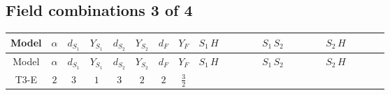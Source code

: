 \documentclass[8pt]{article}
\begin{document}
\begin{landscape}
\subsection*{Field combinations 3 of 4}
\begin{longtable}{@{}cccccccc >{\raggedright\arraybackslash}p{0.21\linewidth} >{\raggedright\arraybackslash}p{0.21\linewidth} >{\raggedright\arraybackslash}p{0.21\linewidth}@{}}
\toprule
Model & $\alpha$ & $d_{S_1}$ & $Y_{S_1}$ & $d_{S_2}$ & $Y_{S_2}$ & $d_F$ & $Y_F$ & $S_1\,H$ & $S_1\,S_2$ & $S_2\,H$ \\
\midrule
\endfirsthead
\toprule
Model & $\alpha$ & $d_{S_1}$ & $Y_{S_1}$ & $d_{S_2}$ & $Y_{S_2}$ & $d_F$ & $Y_F$ & $S_1\,H$ & $S_1\,S_2$ & $S_2\,H$ \\
\midrule
\endhead
T3-E & $2$ & $3$ & $1$ & $3$ & $2$ & $2$ & $\frac{3}{2}$ & \scriptsize\adjustbox{max width=\linewidth}{$\begin{gathered} +\frac{1}{2} H_{a_2} S_{1,j_2} H_{a_1}{}^{\dagger } S_{1,j_1}{}^{\dagger } \mathcal{I}_{H1,a_1,a_2,j_1,j_2}{}^1 \lambda_{HS_1}^{(1)}^{(1)} \\ +\frac{1}{2} H_{a_2} S_{1,j_2} H_{a_1}{}^{\dagger } S_{1,j_1}{}^{\dagger } \mathcal{I}_{H1,a_1,a_2,j_2,j_1}{}^1 \lambda_{HS_1}^{(1)}^{(1)} \\ +\frac{1}{2} H_{a_2} S_{1,j_2} H_{a_1}{}^{\dagger } S_{1,j_1}{}^{\dagger } \mathcal{I}_{H1,a_1,a_2,j_1,j_2}{}^2 \lambda_{HS_1}^{(1)}^{(2)}\end{gathered}$} & \scriptsize\adjustbox{max width=\linewidth}{$\begin{gathered} +S_{1,j_3} S_{2,j_4} S_{1,j_1}{}^{\dagger } S_{2,j_2}{}^{\dagger } \mathcal{I}_{12,j_1,j_3,j_2,j_4}{}^1 \lambda_{12}^{(1)}^{(1)} \\ +S_{1,j_3} S_{2,j_4} S_{1,j_1}{}^{\dagger } S_{2,j_2}{}^{\dagger } \mathcal{I}_{12,j_1,j_3,j_2,j_4}{}^2 \lambda_{12}^{(1)}^{(2)} \\ +S_{1,j_3} S_{2,j_4} S_{1,j_1}{}^{\dagger } S_{2,j_2}{}^{\dagger } \mathcal{I}_{12,j_1,j_3,j_2,j_4}{}^3 \lambda_{12}^{(1)}^{(3)}\end{gathered}$} & \scriptsize\adjustbox{max width=\linewidth}{$\begin{gathered} +\frac{1}{2} H_{a_2} S_{2,j_2} H_{a_1}{}^{\dagger } S_{2,j_1}{}^{\dagger } \mathcal{I}_{H2,a_1,a_2,j_1,j_2}{}^1 \lambda_{HS_2}^{(1)}^{(1)} \\ +\frac{1}{2} H_{a_2} S_{2,j_2} H_{a_1}{}^{\dagger } S_{2,j_1}{}^{\dagger } \mathcal{I}_{H2,a_1,a_2,j_2,j_1}{}^1 \lambda_{HS_2}^{(1)}^{(1)} \\ +\frac{1}{2} H_{a_2} S_{2,j_2} H_{a_1}{}^{\dagger } S_{2,j_1}{}^{\dagger } \mathcal{I}_{H2,a_1,a_2,j_1,j_2}{}^2 \lambda_{HS_2}^{(1)}^{(2)}\end{gathered}$} \\

\end{longtable}
\end{landscape}
\end{document}

